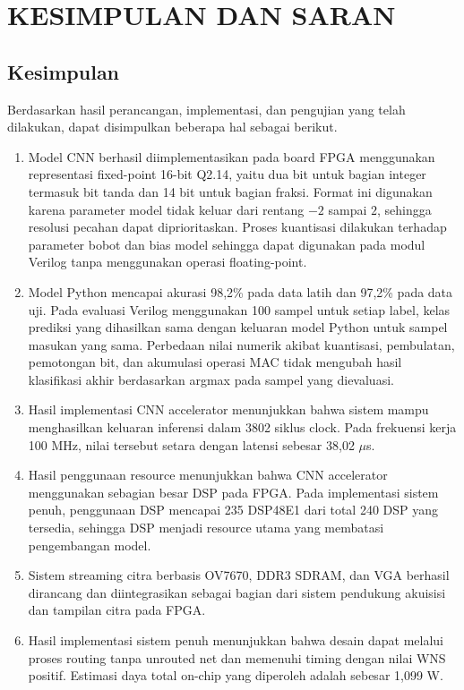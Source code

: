\chapter{KESIMPULAN DAN SARAN}

\section{Kesimpulan}
Berdasarkan hasil perancangan, implementasi, dan pengujian yang telah dilakukan, dapat disimpulkan beberapa hal sebagai berikut.

\begin{enumerate}
    \item Model CNN berhasil diimplementasikan pada board FPGA menggunakan representasi fixed-point 16-bit Q2.14, yaitu dua bit untuk bagian integer termasuk bit tanda dan 14 bit untuk bagian fraksi. Format ini digunakan karena parameter model tidak keluar dari rentang $-2$ sampai $2$, sehingga resolusi pecahan dapat diprioritaskan. Proses kuantisasi dilakukan terhadap parameter bobot dan bias model sehingga dapat digunakan pada modul Verilog tanpa menggunakan operasi floating-point.

    \item Model Python mencapai akurasi 98,2\% pada data latih dan 97,2\% pada data uji. Pada evaluasi Verilog menggunakan 100 sampel untuk setiap label, kelas prediksi yang dihasilkan sama dengan keluaran model Python untuk sampel masukan yang sama. Perbedaan nilai numerik akibat kuantisasi, pembulatan, pemotongan bit, dan akumulasi operasi MAC tidak mengubah hasil klasifikasi akhir berdasarkan argmax pada sampel yang dievaluasi.

    \item Hasil implementasi CNN accelerator menunjukkan bahwa sistem mampu menghasilkan keluaran inferensi dalam 3802 siklus clock. Pada frekuensi kerja 100 MHz, nilai tersebut setara dengan latensi sebesar 38,02 $\mu$s.

    \item Hasil penggunaan resource menunjukkan bahwa CNN accelerator menggunakan sebagian besar DSP pada FPGA. Pada implementasi sistem penuh, penggunaan DSP mencapai 235 DSP48E1 dari total 240 DSP yang tersedia, sehingga DSP menjadi resource utama yang membatasi pengembangan model.

    \item Sistem streaming citra berbasis OV7670, DDR3 SDRAM, dan VGA berhasil dirancang dan diintegrasikan sebagai bagian dari sistem pendukung akuisisi dan tampilan citra pada FPGA.

    \item Hasil implementasi sistem penuh menunjukkan bahwa desain dapat melalui proses routing tanpa unrouted net dan memenuhi timing dengan nilai WNS positif. Estimasi daya total on-chip yang diperoleh adalah sebesar 1,099 W.
\end{enumerate}


